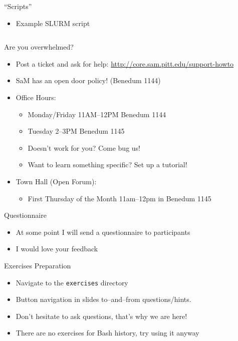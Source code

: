\documentclass[hyperref={pdfpagelabels=false},12pt]{beamer}
\begin{document}
\begin{frame}{``Scripts''}
    \begin{itemize}
        \item Example SLURM script
    \end{itemize}
\inputminted[bgcolor=lightgray,linenos,fontsize=\footnotesize]{bash}{code/benzene.slurm}
\end{frame}

\begin{frame}{Are you overwhelmed?}
    \begin{itemize}
        \item Post a ticket and ask for help: \url{http://core.sam.pitt.edu/support-howto}
        \item SaM has an open door policy! (Benedum 1144)
        \item Office Hours:
        \begin{itemize}
            \item Monday/Friday 11AM--12PM Benedum 1144
            \item Tuesday 2--3PM Benedum 1145 
            \item Doesn't work for you? Come bug us!
            \item Want to learn something specific? Set up a tutorial!
        \end{itemize}
        \item Town Hall (Open Forum):
        \begin{itemize}
            \item First Thursday of the Month 11am--12pm in Benedum 1145
        \end{itemize}
    \end{itemize}
\end{frame}

\begin{frame}{Questionnaire}
    \begin{itemize}
        \item At some point I will send a questionnaire to participants
        \item I would love your feedback
    \end{itemize}    
\end{frame}

\begin{frame}{Exercises Preparation}
    \begin{itemize}
        \item Navigate to the \texttt{exercises} directory
        \item Button navigation in slides to--and--from questions/hints.
        \item Don't hesitate to ask questions, that's why we are here!
        \item There are no exercises for Bash history, try using it anyway
    \end{itemize}
\end{frame}
\end{document}

